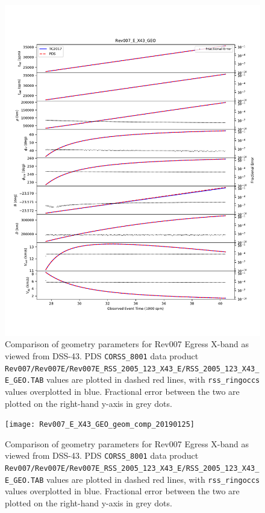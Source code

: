 \documentclass[titlepage, 12pt]{article}
\begin{document}
            \begin{figure}[H]
                \includegraphics[page=1,width=\textwidth]
                    {figs/Rev007_E_X43_GEO_geom_comp_20190125.pdf}
                \caption[Comparison of geometry parameters for Rev007 Egress X-band.]
                    {Comparison of geometry parameters for Rev007 Egress X-band as viewed
                     from DSS-43. PDS \texttt{CORSS\_8001} data product
                     \texttt{Rev007/Rev007E/Rev007E\_RSS\_2005\_123\_X43\_E/RSS\_2005\_123\_X43\_E\_GEO.TAB}
                     values are plotted in dashed red lines, with \texttt{rss\_ringoccs} values
                     overplotted in blue. Fractional error between the two are plotted
                     on the right-hand y-axis in grey dots.}
                \label{fig:rev7ex43_geom_comp_1}
            \end{figure}
            \begin{figure}[H]
                \texttt{[image: Rev007\_E\_X43\_GEO\_geom\_comp\_20190125]}
                \caption[More comparisons of Rev007 geometry.]
                    {Comparison of geometry parameters for Rev007 Egress X-band as
                     viewed from DSS-43. PDS \texttt{CORSS\_8001} data product
                     \texttt{Rev007/Rev007E/Rev007E\_RSS\_2005\_123\_X43\_E/RSS\_2005\_123\_X43\_E\_GEO.TAB}
                     values are plotted in dashed red lines, with \texttt{rss\_ringoccs}
                     values overplotted in blue. Fractional error between the two are
                     plotted on the right-hand y-axis in grey dots.}
                \label{fig:rev7ex43_geom_comp_2}
            \end{figure}
\end{document}
